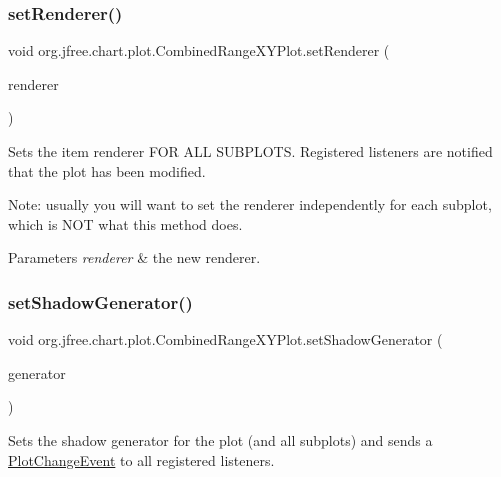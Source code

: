 \subsubsection{\texorpdfstring{set\+Renderer()}{setRenderer()}}
{\footnotesize\ttfamily void org.\+jfree.\+chart.\+plot.\+Combined\+Range\+X\+Y\+Plot.\+set\+Renderer (\begin{DoxyParamCaption}\item[{\mbox{\hyperlink{interfaceorg_1_1jfree_1_1chart_1_1renderer_1_1xy_1_1_x_y_item_renderer}{X\+Y\+Item\+Renderer}}}]{renderer }\end{DoxyParamCaption})}

Sets the item renderer F\+OR A\+LL S\+U\+B\+P\+L\+O\+TS. Registered listeners are notified that the plot has been modified. 

Note\+: usually you will want to set the renderer independently for each subplot, which is N\+OT what this method does.


\begin{DoxyParams}{Parameters}
{\em renderer} & the new renderer. \\
\hline
\end{DoxyParams}
\mbox{\label{classorg_1_1jfree_1_1chart_1_1plot_1_1_combined_range_x_y_plot_a7da5daf6981a6be1acf680bf1d612c3b}} 
\subsubsection{\texorpdfstring{set\+Shadow\+Generator()}{setShadowGenerator()}}
{\footnotesize\ttfamily void org.\+jfree.\+chart.\+plot.\+Combined\+Range\+X\+Y\+Plot.\+set\+Shadow\+Generator (\begin{DoxyParamCaption}\item[{\mbox{\hyperlink{interfaceorg_1_1jfree_1_1chart_1_1util_1_1_shadow_generator}{Shadow\+Generator}}}]{generator }\end{DoxyParamCaption})}

Sets the shadow generator for the plot (and all subplots) and sends a \mbox{\hyperlink{}{Plot\+Change\+Event}} to all registered listeners.


